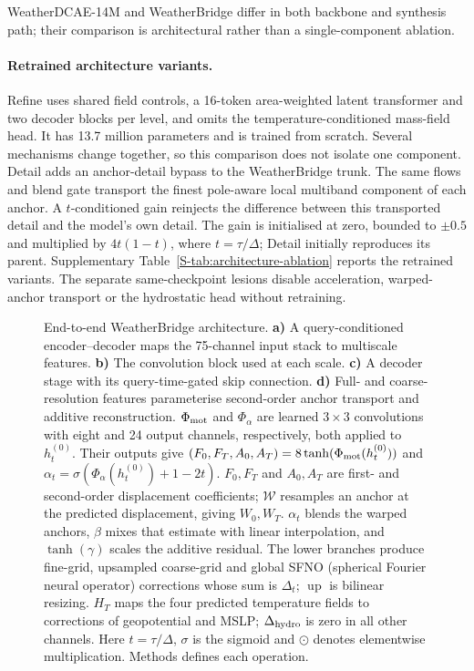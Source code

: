 \documentclass[referee,lineno,pdflatex,sn-nature]{sn-jnl}
\begin{document}
\begin{deferredmethodsintro}
WeatherDCAE-14M and WeatherBridge differ in both backbone and synthesis path;
their comparison is architectural rather than a single-component ablation.

\paragraph{Retrained architecture variants.}
Refine uses shared field controls, a 16-token area-weighted latent transformer
and two decoder blocks per level, and omits the temperature-conditioned
mass-field head. It has 13.7 million parameters and is trained from scratch.
Several mechanisms change together, so this comparison does not isolate
one component. Detail adds an anchor-detail bypass to the WeatherBridge
trunk. The same flows and blend gate transport the finest pole-aware local
multiband component of each anchor. A $t$-conditioned gain reinjects the
difference between this transported detail and the model's own detail.
The gain is initialised at zero, bounded to $\pm0.5$ and multiplied by
$4t(1-t)$, where $t=\tau/\Delta$; Detail initially reproduces its parent.
Supplementary Table~\ref{S-tab:architecture-ablation} reports the retrained
variants. The separate same-checkpoint lesions disable acceleration,
warped-anchor transport or the hydrostatic head without retraining.

\end{deferredmethodsintro}

\begin{figure}[!t]
\centering
\resizebox{\textwidth}{!}{%
%
}
\caption{End-to-end WeatherBridge architecture. \textbf{a)} A
query-conditioned encoder--decoder maps the 75-channel input stack to
multiscale features. \textbf{b)} The convolution block used at each scale.
\textbf{c)} A decoder stage with its query-time-gated skip connection.
\textbf{d)} Full- and coarse-resolution features parameterise
second-order anchor transport and additive reconstruction.
$\Phi_{\rm mot}$ and $\Phi_\alpha$ are learned $3\times3$ convolutions
with eight and 24 output channels, respectively, both applied to
$h_t^{(0)}$. Their outputs give
$(F_0,F_T,A_0,A_T)=8\tanh(\Phi_{\rm mot}(h_t^{(0)}))$ and
$\alpha_t=\sigma(\Phi_\alpha(h_t^{(0)})+1-2t)$.
$F_0,F_T$ and $A_0,A_T$ are first- and second-order
displacement coefficients; $\mathcal W$ resamples an anchor at the
predicted displacement, giving $W_0,W_T$.
$\alpha_t$ blends the warped anchors, $\beta$ mixes that estimate with
linear interpolation, and $\tanh(\gamma)$ scales the additive residual.
The lower branches produce fine-grid, upsampled coarse-grid and global
SFNO (spherical Fourier neural operator) corrections whose sum is
$\Delta_t$; $\operatorname{up}$ is bilinear resizing.
$H_T$ maps the four predicted temperature fields to corrections of
geopotential and MSLP; $\Delta_{\rm hydro}$ is zero in all other channels.
Here $t=\tau/\Delta$, $\sigma$ is the sigmoid and $\odot$ denotes
elementwise multiplication. Methods defines each operation.}
\label{fig:tikz_flow}
\end{figure}
\end{document}
